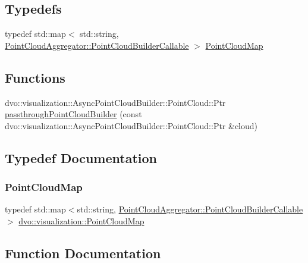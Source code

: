 \subsection*{Typedefs}
\begin{DoxyCompactItemize}
\item 
typedef std\+::map$<$ std\+::string, \mbox{\hyperlink{classdvo_1_1visualization_1_1_point_cloud_aggregator_ae1b18727d90a4dd9bdca6305a1910919}{Point\+Cloud\+Aggregator\+::\+Point\+Cloud\+Builder\+Callable}} $>$ \mbox{\hyperlink{namespacedvo_1_1visualization_a6bfc209b639de1fc1fb54582af7292f7}{Point\+Cloud\+Map}}
\end{DoxyCompactItemize}
\subsection*{Functions}
\begin{DoxyCompactItemize}
\item 
dvo\+::visualization\+::\+Async\+Point\+Cloud\+Builder\+::\+Point\+Cloud\+::\+Ptr \mbox{\hyperlink{namespacedvo_1_1visualization_a6bc29f6202a53878a0e89d1d50d1f20f}{passthrough\+Point\+Cloud\+Builder}} (const dvo\+::visualization\+::\+Async\+Point\+Cloud\+Builder\+::\+Point\+Cloud\+::\+Ptr \&cloud)
\end{DoxyCompactItemize}


\subsection{Typedef Documentation}
\mbox{\label{namespacedvo_1_1visualization_a6bfc209b639de1fc1fb54582af7292f7}} 
\subsubsection{\texorpdfstring{Point\+Cloud\+Map}{PointCloudMap}}
{\footnotesize\ttfamily typedef std\+::map$<$std\+::string, \mbox{\hyperlink{classdvo_1_1visualization_1_1_point_cloud_aggregator_ae1b18727d90a4dd9bdca6305a1910919}{Point\+Cloud\+Aggregator\+::\+Point\+Cloud\+Builder\+Callable}}$>$ \mbox{\hyperlink{namespacedvo_1_1visualization_a6bfc209b639de1fc1fb54582af7292f7}{dvo\+::visualization\+::\+Point\+Cloud\+Map}}}



\subsection{Function Documentation}
\mbox{\label{namespacedvo_1_1visualization_a6bc29f6202a53878a0e89d1d50d1f20f}} 
